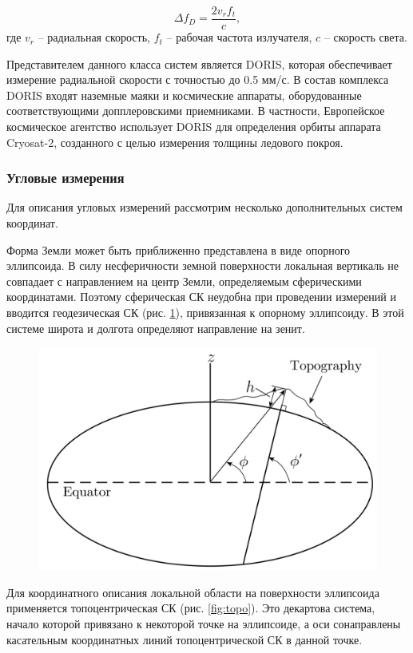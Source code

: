 \begin{equation*}
    \Delta f_D = \frac{2 v_r f_t}{c},
\end{equation*}
где $v_r$ -- радиальная скорость, $f_t$ -- рабочая частота излучателя, $c$ -- скорость света.

Представителем данного класса систем является DORIS,
которая обеспечивает измерение радиальной скорости с точностью до 0.5 мм/с.
В состав комплекса DORIS входят наземные маяки и космические аппараты, 
оборудованные соответствующими допплеровскими приемниками. 
В частности, Европейское космическое агентство 
использует DORIS для определения орбиты аппарата Cryosat-2, 
созданного с целью измерения толщины ледового покроя.

\subsubsection{Угловые измерения}

Для описания угловых измерений рассмотрим несколько дополнительных систем координат.

Форма Земли может быть приближенно представлена в виде опорного эллипсоида.
В силу несферичности земной поверхности локальная вертикаль не совпадает с направлением на центр Земли, определяемым сферическими координатами.
Поэтому сферическая СК неудобна при проведении измерений 
и вводится геодезическая СК (рис. \ref{fig:geodes}), привязанная к опорному эллипсоиду.
В этой системе широта и долгота определяют направление на зенит.

\begin{figure}[h!]
    \centering
    \includegraphics[width=0.5\linewidth]{../images/review/geodes.PNG}
    \label{fig:geodes}
\end{figure}

Для координатного описания локальной области на поверхности эллипсоида
применяется топоцентрическая СК (рис. \ref{fig:topo}). Это декартова система, начало которой привязано к некоторой точке на эллипсоиде,
а оси сонаправлены касательным координатных линий топоцентрической СК в данной точке.

